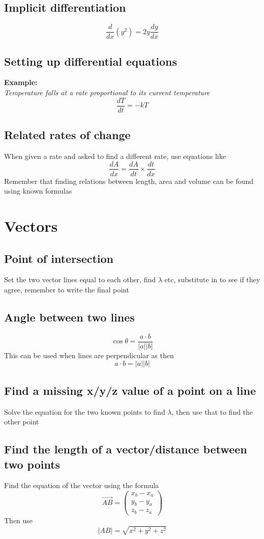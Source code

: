 \documentclass{article}[18pt]
\begin{document}
\subsection{Implicit differentiation}
$$\frac{d}{dx}(y^2)=2y\frac{dy}{dx}$$
\subsection{Setting up differential equations}
\textbf{Example:}\\
\textit{Temperature falls at a rate proportional to its current temperature}
$$\frac{dT}{dt}=-kT$$
\subsection{Related rates of change}
When given a rate and asked to find a different rate, use equations like
$$\frac{dA}{dx}=\frac{dA}{dt}\times\frac{dt}{dx}$$
Remember that finding relations between length, area and volume can be found using known formulas
\section{Vectors}
\subsection{Point of intersection}
Set the two vector lines equal to each other, find $\lambda$ etc, substitute in to see if they agree, remember to write the final point
\subsection{Angle between two lines}
$$\cos\theta=\frac{a\cdot b}{|a||b|}$$
This can be used when lines are perpendicular as then
$$a\cdot b=|a||b|$$
\subsection{Find a missing x/y/z value of a point on a line}
Solve the equation for the two known points to find $\lambda$, then use that to find the other point
\subsection{Find the length of a vector/distance between two points}
Find the equation of the vector using the formula
$$\overrightarrow{AB}=\begin{pmatrix}x_b-x_a\\y_b-y_a\\z_b-z_a\end{pmatrix}$$
Then use
$$|AB|=\sqrt{x^2+y^2+z^2}$$
\end{document}
